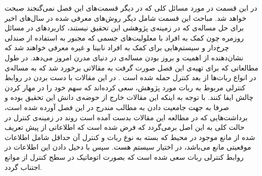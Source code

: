 در این قسمت در مورد مسائل کلی که در دیگر قسمت‌های این فصل نمی‌گنجند صبحت خواهد شد. مباحث این قسمت شامل دیگر روش‌های معرفی شده در سال‌های اخیر برای حل مساله‌ی  که در زمینه‌ی پژوهشی این تحقیق نیستند، کاربردهای  در مسائل روزمره چون کمک به افراد با معلولیت‌های جسمی که مجبور به استفاده از صندلی چرخ‌دار و سیستم‌هایی برای کمک به افراد نابینا و غیره معرفی خواهند شد که نشان‌دهنده‌ از اهمیت و بروز بودن مساله‌ی  در دنیای مدرن امروز می‌دهد.
در طول مطالعاتی که برای تهیه‌ی این فصل صورت گرفت به مقالاتی برخورد شد که به مساله‌ی  در انواع ربات‌ها از بعد کنترل حمله شده است
\cite{geng2013obstacle, dong2015obstacle, yao2015real, yang2016nonlinear}.
در این مقالات با دست بردن در روابط کنترلی مربوط به ربات مورد پژوهش، سعی کرده‌اند که سهم خود را در مهار کردن چالش  ایفا کنند. با توجه به اینکه این مقالات خارج از حوضه‌ی دانش این تحقیق بوده و صرفا به جهت جامعیت دادن به مطالب مندرج در این فصل آورده شده است، برداشت‌هایی که در مطالعه این مقالات بدست آمده است روند  در زمینه‌ی کنترل در حالت کلی به این اصل برمی‌گردد که فرض شده است که اطلاعاتی از پیش تعریف شده از مانع موجود در محیط که بسته به نوع ربات و کنترل آن حداقل شامل اطلاعات موقعیتی مانع می‌باشد، در اختیار سیستم هست. سپس با دخیل دادن این اطلاعات در روابط کنترلی ربات سعی شده است که بصورت اتوماتیک در سطح کنترل از موانع اجتناب گردد.
